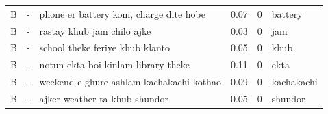 \begin{tabular}{lllrrl}
B & - & phone er battery kom, charge dite hobe & 0.07 & 0 & battery \\
B & - & rastay khub jam chilo ajke & 0.03 & 0 & jam \\
B & - & school theke feriye khub klanto & 0.05 & 0 & khub \\
B & - & notun ekta boi kinlam library theke & 0.11 & 0 & ekta \\
B & - & weekend e ghure ashlam kachakachi kothao & 0.09 & 0 & kachakachi \\
B & - & ajker weather ta khub shundor & 0.05 & 0 & shundor \\
\bottomrule
\end{tabular}
